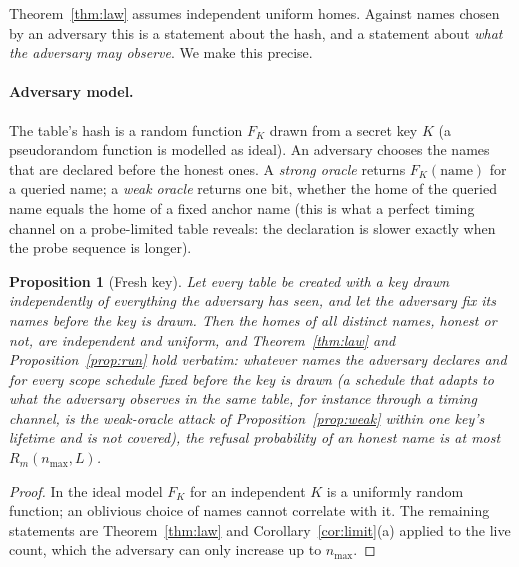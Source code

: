 \documentclass[11pt,a4paper]{article}
\newtheorem{proposition}[theorem]{Proposition}
\theoremstyle{definition}
\theoremstyle{remark}
\begin{document}
Theorem~\ref{thm:law} assumes independent uniform homes. Against names chosen by an adversary this is a statement about the hash, and a statement about \emph{what the adversary may observe}. We make this precise.

\paragraph{Adversary model.} The table's hash is a random function $F_K$ drawn from a secret key $K$ (a pseudorandom function is modelled as ideal). An adversary chooses the names that are declared before the honest ones. A \emph{strong oracle} returns $F_K(\text{name})$ for a queried name; a \emph{weak oracle} returns one bit, whether the home of the queried name equals the home of a fixed anchor name (this is what a perfect timing channel on a probe-limited table reveals: the declaration is slower exactly when the probe sequence is longer).

\begin{proposition}[Fresh key]\label{prop:fresh}
Let every table be created with a key drawn independently of everything the adversary has seen, and let the adversary fix its names before the key is drawn. Then the homes of all distinct names, honest or not, are independent and uniform, and Theorem~\ref{thm:law} and Proposition~\ref{prop:run} hold verbatim: whatever names the adversary declares and for every scope schedule fixed before the key is drawn (a schedule that adapts to what the adversary observes in the same table, for instance through a timing channel, is the weak-oracle attack of Proposition~\ref{prop:weak} within one key's lifetime and is not covered), the refusal probability of an honest name is at most $R_m(n_{\max},L)$.
\end{proposition}
\begin{proof}
In the ideal model $F_K$ for an independent $K$ is a uniformly random function; an oblivious choice of names cannot correlate with it. The remaining statements are Theorem~\ref{thm:law} and Corollary~\ref{cor:limit}(a) applied to the live count, which the adversary can only increase up to $n_{\max}$.
\end{proof}
\end{document}
